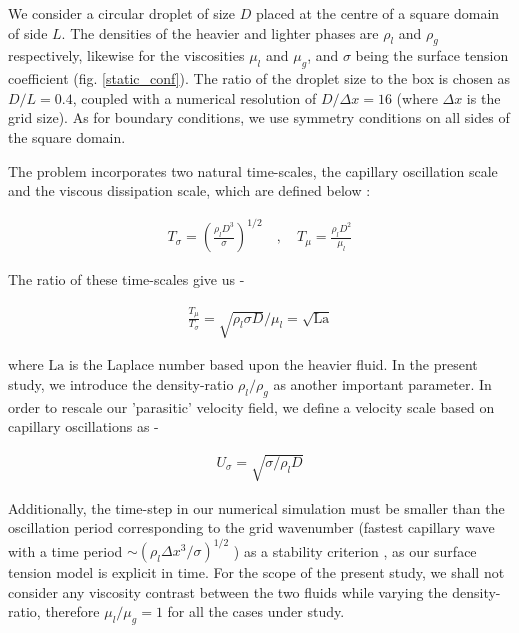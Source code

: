 We consider a circular droplet of size $D$  placed at the centre of a square domain of side $L$. The densities of the heavier and lighter phases are $\rho_l$ and $\rho_g$ respectively, likewise for the viscosities $\mu_l$ and $\mu_g$, and $\sigma$ being the surface tension coefficient (fig. \ref{static_conf}). The ratio of the droplet size to the box is chosen as $D/L = 0.4$, coupled with a numerical resolution of $D/\Delta x= 16$ (where $\Delta x$ is the grid size). As for boundary conditions, we use symmetry conditions on all sides of the square domain.

The problem incorporates two natural time-scales, the capillary oscillation scale and the viscous dissipation scale, which are defined below :

\begin{align}
        T_\sigma = \left(\frac{\rho_l D^3}{\sigma}\right)^{1/2} \quad , \quad T_\mu = \frac{\rho_l D^2}{\mu_l}
\label{ts}
\end{align}

The ratio of these time-scales give us -

\begin{align}
	\frac{T_\mu}{T_\sigma} = \sqrt{\rho_l \sigma D}/\mu_l = \sqrt{\textrm{La}}
\end{align}

where $\textrm{La}$ is the Laplace number based upon the heavier fluid. In the present study, we introduce the density-ratio $\rho_l/\rho_g$ as another important parameter. In order to rescale our 'parasitic' velocity field, we define a velocity scale based on capillary oscillations as -

\begin{align}
        U_\sigma = \sqrt{\sigma/\rho_l D}
\end{align}

Additionally, the time-step in our numerical simulation must be smaller than the oscillation period corresponding to the grid wavenumber (fastest capillary wave with a time period $\sim \left( \rho_l \Delta x^3 / \sigma  \right)^{1/2} $ ) as a stability criterion , as our surface tension model is explicit in time. For the scope of the present study, we shall not consider any viscosity contrast between the two fluids while varying the density-ratio, therefore $\mu_l/\mu_g = 1$ for all the cases under study.


